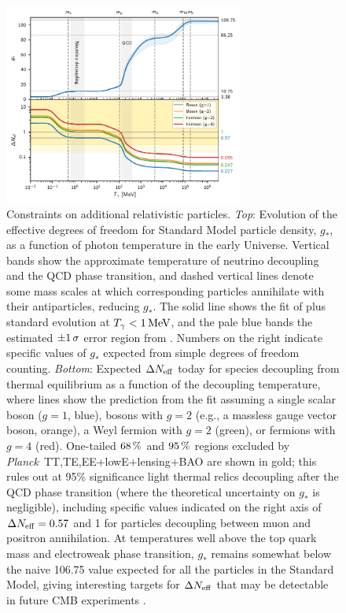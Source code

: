 \documentclass[longauth,traditabstract]{aa}
\def\Planck{\textit{Planck}}
\def\,{\thinspace}
\newcommand{\mksym}[1]{\ifmmode {\rm #1}\else #1\fi}
\newcommand{\dataplus}{\allowbreak+}
\newcommand{\TTTEEE}{\mksym{TT,TE,EE}}
\newcommand{\planckTTTEEEonly}{\planck\ \TTTEEE}
\newcommand{\lowE}{\mksym{lowE}}
\newcommand{\planckall}{\planckTTTEEEonly\dataplus\lowE}
\newcommand{\nnu}{N_{\rm eff}}
\providecommand{\text}[1]{\rm{#1}}
\newcommand{\MeV}{\,\text{MeV}}
\newcommand{\planck}{\Planck}
\begin{document}
\begin{figure}[htbp!]
\centering
\includegraphics[width =0.7\textwidth]{nnu_limits_decoupling.pdf}
\caption{
Constraints on additional relativistic particles.
{\it Top}:
Evolution of the effective degrees of freedom for Standard Model particle density, $g_*$, as a function of photon temperature in the early Universe. Vertical bands show the approximate temperature of neutrino decoupling and the QCD phase transition, and dashed vertical lines denote some mass scales at which corresponding particles annihilate with their antiparticles, reducing $g_*$. The solid line shows the fit of \citet{Borsanyi:2016ksw} plus standard evolution at $T_\gamma<1 \MeV$, and the pale blue bands the estimated $\pm1\,\sigma$ error region from \citet{Saikawa:2018rcs}. Numbers on the right indicate specific values of $g_*$ expected from simple degrees of freedom counting.
{\it Bottom}:
Expected $\Delta \nnu$ today for species decoupling from thermal equilibrium as a function of the decoupling temperature, where lines show the prediction from the \citet{Borsanyi:2016ksw} fit assuming a single scalar boson ($g=1$, blue), bosons with $g=2$ (e.g., a massless gauge vector boson, orange), a Weyl fermion with $g=2$ (green), or fermions with $g=4$ (red).
One-tailed $68\,\%$ and $95\,\%$ regions excluded by \planckall+lensing+BAO are shown in gold; this rules out at 95\,\% significance light thermal relics decoupling after the QCD phase transition (where the theoretical uncertainty on $g_*$ is negligible), including specific values indicated on the right axis of $\Delta\nnu = 0.57$ and 1 for particles decoupling between muon and positron annihilation. At temperatures well above the top quark mass and electroweak phase transition, $g_*$ remains somewhat below the naive 106.75 value expected for all the particles in the Standard Model, giving interesting targets for $\Delta \nnu$ that may be detectable in future CMB experiments \citep[see e.g.][]{Baumann:2017}.
\label{fig:Neff-Temp}
}
\end{figure}
\end{document}
